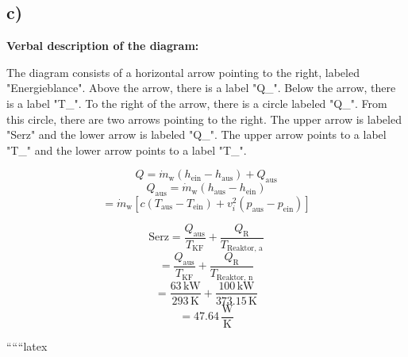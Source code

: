 

\subsection*{c)}
\textbf{Verbal description of the diagram:}

The diagram consists of a horizontal arrow pointing to the right, labeled "Energieblance". Above the arrow, there is a label "Q_{}". Below the arrow, there is a label "T_{}". To the right of the arrow, there is a circle labeled "Q_{}". From this circle, there are two arrows pointing to the right. The upper arrow is labeled "Serz" and the lower arrow is labeled "Q_{}". The upper arrow points to a label "T_{}" and the lower arrow points to a label "T_{}".

\[
Q = \dot{m}_{\text{w}} (h_{\text{ein}} - h_{\text{aus}}) + Q_{\text{aus}}
\]
\[
Q_{\text{aus}} = \dot{m}_{\text{w}} (h_{\text{aus}} - h_{\text{ein}})
\]
\[
= \dot{m}_{\text{w}} \left[ c (T_{\text{aus}} - T_{\text{ein}}) + v_i^2 (p_{\text{aus}} - p_{\text{ein}}) \right]
\]

\[
\text{Serz} = \frac{Q_{\text{aus}}}{T_{\text{KF}}} + \frac{Q_{\text{R}}}{T_{\text{Reaktor, a}}}
\]
\[
= \frac{Q_{\text{aus}}}{T_{\text{KF}}} + \frac{Q_{\text{R}}}{T_{\text{Reaktor, n}}}
\]
\[
= \frac{63 \, \text{kW}}{293 \, \text{K}} + \frac{100 \, \text{kW}}{373.15 \, \text{K}}
\]
\[
= 47.64 \, \frac{\text{W}}{\text{K}}
\]

``````latex